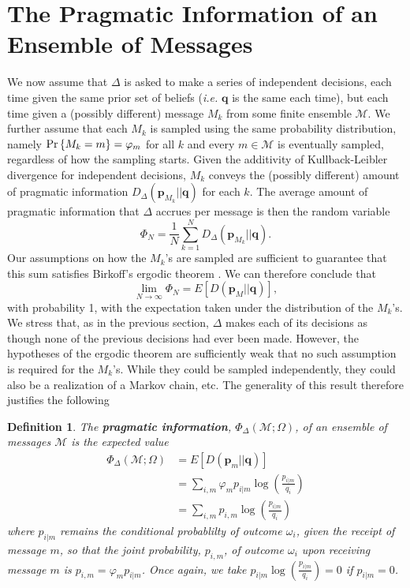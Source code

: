 \documentclass[11pt]{article}
\newtheorem*{definition}{Definition}
\begin{document}
\section{The Pragmatic Information of an Ensemble of Messages}
We now assume that $\Delta$ is asked to make a series of independent decisions, each time given the same prior set of beliefs ({\it i.e.} $\mathbf q$ is the same each time), but each time given a (possibly different) 
message $M_k$ from some finite ensemble $\mathcal M$.  
We further assume that each $M_k$ is sampled using the same probability distribution, namely ${\rm Pr}\left\{M_k = m \right\} = \varphi_m$ for all $k$ and 
every $m \in \mathcal M$ is eventually sampled, regardless of how the sampling starts.  Given the additivity of Kullback-Leibler divergence for independent decisions, 
$M_k$ conveys the (possibly different) amount of pragmatic information $D_\Delta(\mathbf p_{M_k} || \mathbf q)$ for each $k$.  
The average amount of pragmatic information that $\Delta$ accrues per message is then the random variable
$$
\Phi_N = \frac{1}{N} \sum_{k=1}^N D_\Delta(\mathbf p_{M_k} || \mathbf q).
$$ 
Our assumptions on how the $M_k$'s are sampled are sufficient to guarantee that this sum satisfies Birkoff's ergodic theorem \cite{Billingsley}.  We can therefore conclude that
$$
\lim_{N \rightarrow \infty} \Phi_N = E \left[ D(\mathbf p_M || \mathbf q) \right],
$$
with probability 1, with the expectation taken under the distribution of the $M_k$'s.  
We stress that, as in the previous section, $\Delta$ makes each of its decisions as though none of the previous decisions had ever been made.  However, the hypotheses of the ergodic theorem are sufficiently weak 
that no such assumption is required for the $M_k$'s.  While they could be sampled independently, they could also be a realization of a Markov chain, etc.  The generality of this result therefore justifies the following 
\begin{definition}
The {\bf pragmatic information}, ${\Phi_\Delta (\mathcal M; \Omega)}$,  of an ensemble of messages ${\mathcal M}$ is the expected value 
\begin{align*}
 \Phi_\Delta (\mathcal M; \Omega) &= E \left[ D(\mathbf p_m || \mathbf q) \right] \\
                                      &= \sum_{i, m} \varphi_m  p_{i|m} \log \left(\frac{p_{i|m}}{q_i}\right) \\
                                     &= \sum_{i, m}  p_{i,m} \log \left(\frac{p_{i|m}}{q_i}\right)
\end{align*}
where $p_{i|m}$ remains the conditional probablilty of outcome $\omega_i$, given the receipt of message $m$, so that the joint probability, $p_{i,m}$, of outcome $\omega_i$ upon receiving message $m$ is $p_{i,m} = \varphi_m  p_{i|m}$.  Once again, we take $p_{i|m} \log \left(\frac{p_{i|m}}{q_i}\right) = 0$ if $p_{i|m} =0$.
\end{definition}
\end{document}

